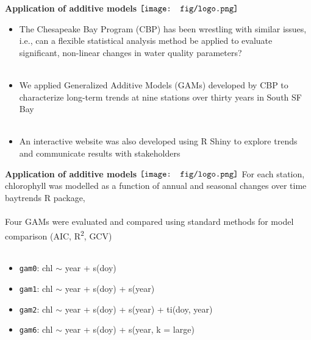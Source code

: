 \documentclass{beamer}
\begin{document}
\begin{frame}{\textbf{Application of additive models} \hspace{0pt plus 1 filll} $\vcenter{\hbox{\texttt{[image: fig/logo.png]}}}$}
\begin{itemize}
\item The Chesapeake Bay Program (CBP) has been wrestling with similar issues, i.e., can a flexible statistical analysis method be applied to evaluate significant, non-linear changes in water quality parameters? {\tiny \cite{Beck17,Murphy19}} \\~\\
\item We applied Generalized Additive Models (GAMs) developed by CBP to characterize long-term trends at nine stations over thirty years in South SF Bay \\~\\
\item An interactive website was also developed using R Shiny to explore trends and communicate results with stakeholders
\end{itemize}
\end{frame}

\begin{frame}{\textbf{Application of additive models} \hspace{0pt plus 1 filll} $\vcenter{\hbox{\texttt{[image: fig/logo.png]}}}$}
For each station, chlorophyll was modelled as a function of annual and seasonal changes over time {\tiny baytrends R package, \cite{Murphy19b}}\\~\\
Four GAMs were evaluated and compared using standard methods for model comparison (AIC, R\textsuperscript{2}, GCV) \\~\\
\begin{itemize}
\item \texttt{gam0}: chl $\sim$ year + s(doy)
\item \texttt{gam1}: chl $\sim$ year + s(doy) + s(year)
\item \texttt{gam2}: chl $\sim$ year + s(doy) + s(year) + ti(doy, year)
\item \texttt{gam6}: chl $\sim$ year + s(doy) + s(year, k = large)
\end{itemize}
\end{frame}
\end{document}
